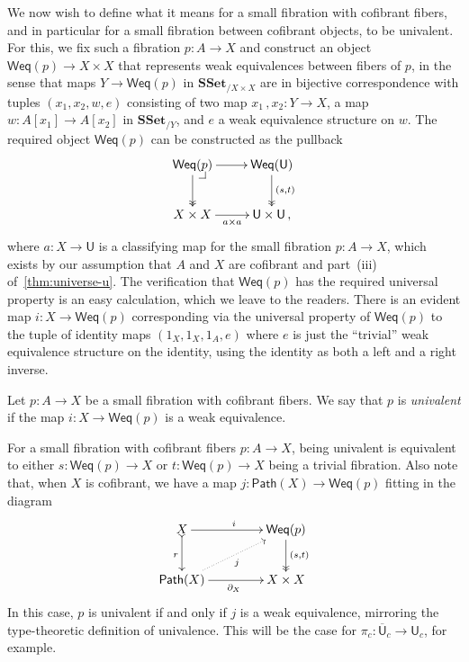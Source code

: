 \documentclass[reqno,10pt,a4paper,oneside,draft]{amsart}
\makeatletter
\numberwithin{equation}{section}
\theoremstyle{mythm}
\theoremstyle{mydef}
\theoremstyle{myrmk}
\newcommand{\pullback}[1]{\save*!/#1-1.2pc/#1:(-1,1)@^{|-}\restore}
\newcommand{\drpullback}{\pullback{dr}}
\newcommand{\myemph}{\textit}
\newcommand{\co}{\colon}
\newcommand{\SSet}{\mathbf{SSet}}
\newcommand{\UU}{\overline{\mathsf{U}}}
\newcommand{\U}{\mathsf{U}}
\newcommand{\Weq}{\mathsf{Weq}}
\newcommand{\Path}{\mathsf{Path}}
\makeatother
\begin{document}
We now wish to define  what it means for a small fibration with cofibrant fibers, and in particular for a small fibration between cofibrant objects, to  be univalent. For this, we fix such a fibration $p \co A \to X$ and construct an object $\Weq(p) \to X \times X$ that represents weak
equivalences between fibers of $p$, in the sense that maps $Y \to \Weq(p)$ in $\SSet_{/X \times X}$ are in bijective correspondence with tuples $(x_1, x_2, w,e)$ consisting of two map $x_1 \, , x_2 \co Y \to X$, a map $w \co A[x_1]
\to A[x_2]$ in $\SSet_{/Y}$, and $e$ a weak equivalence structure on $w$. The required object $\Weq(p)$ can be constructed as the pullback
\[
\xymatrix{
\Weq(p) \drpullback \ar[r] \ar@{->>}[d] & \Weq(\U) \ar@{->>}[d]^{(s,t)} \\
X \times X \ar[r]_{a \times a} & \U \times \U \, ,}
\]
where $a \co X \to \U$ is a classifying map for the small fibration $p \co A \to X$, which exists by our assumption
that $A$ and $X$ are cofibrant and part~(iii) of~\cref{thm:universe-u}. The verification that $\Weq(p)$
has the required universal property is an easy calculation, which we leave to the readers. There is an
evident map $i \co X \to \Weq(p)$ corresponding via the universal property of $\Weq(p)$ to the tuple of identity maps $(1_X, 1_X, 1_A,e)$ where $e$ is just the ``trivial'' weak equivalence structure on the identity, using the identity as both a left and a right inverse.




\begin{definition}  \label{equ:characterisations-of-univalence} Let $p \co A \to X$ be a small fibration with cofibrant fibers. We say that $p$ is \myemph{univalent} if the map $i \co X \to \Weq(p)$ is a weak equivalence. 
\end{definition}

\smallskip

For a small fibration with cofibrant fibers $p \co A \to X$, being univalent is equivalent to
either $s \co \Weq(p) \to X$ or $t \co \Weq(p) \to X$ being a trivial fibration.  Also note that, when $X$
is cofibrant, we have a map $j \co \Path(X) \to \Weq(p)$ fitting in the diagram
\[
\xymatrix@C=1.5cm{
X \ar[r]^i \ar@{>->}[d]_r & \Weq(p) \ar@{->>}[d]^{(s,t)} \\
\Path(X) \ar[r]_{\partial_X}  \ar@{.>}[ur]_{j} &  X \times X }
\]
In this case, $p$ is univalent if and only if $j$ is a weak equivalence, mirroring the type-theoretic
definition of univalence. This will be the case for $\pi_c \co \UU_c \to \U_c$, for example.
\end{document}
